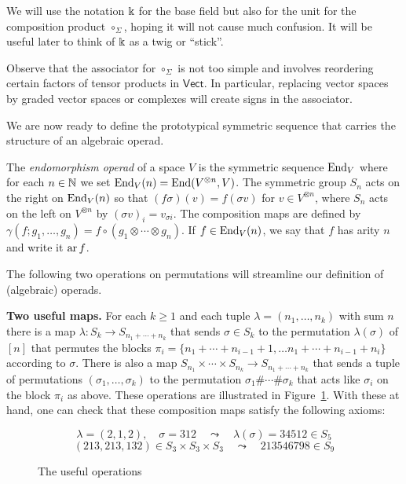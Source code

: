 We will use the notation $\Bbbk$ for the base field but
also for the unit for the composition product $\circ_\Sigma$,
hoping it will not cause much confusion. It will be useful 
later to think of $\Bbbk$ as a twig or ``stick''.

Observe that the associator for $\circ_\Sigma$ is
not too simple and involves reordering certain
factors of tensor products in $\mathsf{Vect}$. In
particular, replacing vector spaces by graded vector
spaces or complexes will create signs in the
associator.

We are now ready to define the prototypical symmetric
 sequence that carries the structure of an algebraic 
 operad. 
 
\begin{definition}
The \emph{endomorphism operad} of a space $V$ is the symmetric sequence $\operatorname{End}_V$
where for each $n\in\mathbb N$ we set $\operatorname{End}_V(n) = \operatorname{End}(V^{\otimes n}, V)$. 
The symmetric group $S_n$ acts on the right
on $\operatorname{End}_V(n)$ 
so that $(f\sigma)(v) = f(\sigma v)$ for
$v\in V^{\otimes n}$, where $S_n$ acts on
the left on $V^{\otimes n}$ by $(\sigma v)_i
= v_{\sigma i}$. The composition maps are defined
by $\gamma(f;g_1,\ldots,g_n) = f\circ (g_1\otimes\cdots \otimes g_n)$. 
If $f\in\operatorname{End}_V(n)$, we say that $f$ has arity $n$ and write
it $\operatorname{ar}{f}$.
\end{definition}


The following two operations on permutations 
will streamline our definition of (algebraic)
operads.

\medskip

\textbf{Two useful maps.} For each $k\geqslant 1$
and each tuple $\lambda = (n_1,\ldots,n_k)$ 
with sum $n$ there is a map $\lambda : S_k
 \longrightarrow S_{n_1+\cdots+n_k} $
that sends $\sigma\in S_k$ to the permutation
$\lambda(\sigma)$ of $[n]$ that permutes the blocks 
$\pi_i = \{n_1+\cdots+n_{i-1}+1,\ldots
			n_1+\cdots+n_{i-1}+n_i\}$
			according to $\sigma$.
There is also a map
$S_{n_1}\times \cdots \times  S_{n_k} 
	\longrightarrow S_{n_1+\cdots+n_k}$
	that sends a tuple of permutations 
	$(\sigma_1,\ldots,\sigma_k)$ to the
	permutation $\sigma_1\#\cdots \# \sigma_k$
	that acts like $\sigma_i$ on the block $\pi_i$
	as above. These operations are illustrated
	in Figure~\ref{fig:1}. With these at hand, 
one can check that these composition maps
satisfy the following axioms:

\begin{figure}
$$\lambda = (2,1,2), \quad \sigma = 312
	\quad \leadsto \quad \lambda(\sigma) =  34512 \in S_5
	$$
	$$
	(213,213,132)\in S_3\times S_3\times S_3 \quad \leadsto \quad 213546798\in S_9 $$
\caption{The useful operations}
\label{fig:1}
\end{figure}

